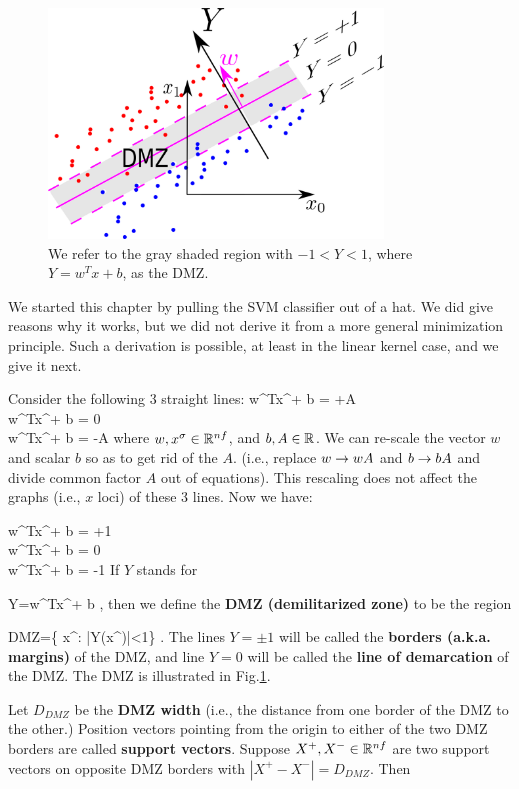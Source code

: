 \begin{figure}[h!]
\centering
\includegraphics[width=3.5in]
{svm/svm-dmz.png}
\caption{We refer to the gray shaded region
with $-1<Y<1$, where $Y= w^T x +b$,  
as the DMZ.}
\label{fig-svm-dmz}
\end{figure}

We started this
chapter by pulling the SVM classifier
out of a hat. We did give
reasons why it works, but we did not derive
it from a more general minimization
principle. Such a derivation
is possible, at least in the 
linear kernel case, and we give it next.


Consider the following 3 straight lines:
\beqa
w^Tx^\s + b = +A
\\
w^Tx^\s + b = 0
\\
w^Tx^\s + b = -A
\eeqa
where $w, x^\sigma\in { \mathbb{R}}^{nf}$, and $b,A\in { \mathbb{R}}$.
We can re-scale the vector $w$ and 
scalar $b$ so as to get rid of the $A$.
(i.e., replace $w\rightarrow wA$ and $b\rightarrow bA$
and divide common factor $A$ out of equations).
This rescaling does not
affect the graphs (i.e., $x$ loci)
of these 3 lines. Now we have:


\beqa
w^Tx^\s + b = +1
\\
w^Tx^\s + b = 0
\\
w^Tx^\s + b = -1
\eeqa
If $Y$ stands for

\beq
Y=w^Tx^\s + b
\;,
\eeq
then we define
the {\bf DMZ (demilitarized zone)}
to be the region 

\beq
DMZ=\{  x^\s: |Y(x^\s)|<1\}
\;.
\eeq
The lines $Y=\pm 1$
will be called the {\bf borders (a.k.a. margins)}
of the DMZ, and 
line $Y=0$
will be called the
{\bf line of demarcation}
of the DMZ.
The DMZ is illustrated in Fig.\ref{fig-svm-dmz}.

Let $D_{DMZ}$ be
the {\bf DMZ width} (i.e., 
the distance from one border
of the DMZ to the other.)
Position vectors 
 pointing 
from the origin to either 
of the two DMZ borders are called 
{\bf support vectors}.
Suppose $X^+, X^-\in { \mathbb{R}}^{nf}$
are two support vectors
on  opposite DMZ borders
with $|X^+-X^-|=D_{DMZ}$. Then 


